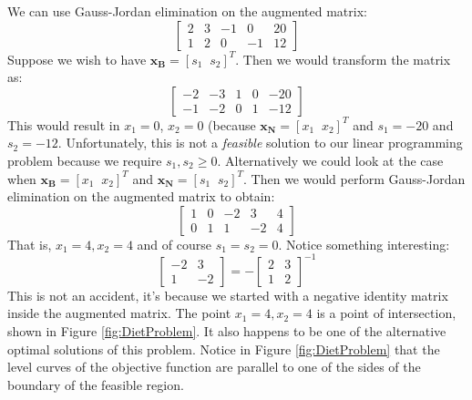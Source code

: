 \begin{example}
We can use Gauss-Jordan elimination on the augmented matrix:
\begin{displaymath}\left[
\begin{array}{cccc|c}
2 & 3 & -1 & 0 & 20\\
1 & 2 & 0 & -1 & 12
\end{array}\right]
\end{displaymath}
Suppose we wish to have $\mathbf{x}_\mathbf{B} = [s_1\;\;s_2]^T$. Then we would transform the matrix as:
\begin{displaymath}\left[
\begin{array}{cccc|c}
-2 & -3 & 1 & 0 & -20\\
-1 & -2 & 0 & 1 & -12
\end{array}\right]
\end{displaymath}
This would result in $x_1 = 0$, $x_2 = 0$ (because $\mathbf{x}_\mathbf{N} = [x_1 \;\; x_2]^T$ and $s_1 = -20$ and $s_2 = -12$. Unfortunately, this is not a \textit{feasible} solution to our linear programming problem because we require $s_1, s_2 \geq 0$. Alternatively we could look at the case when $\mathbf{x}_\mathbf{B} = [x_1\;\;x_2]^T$ and $\mathbf{x}_\mathbf{N} = [s_1 \;\; s_2]^T$. Then we would perform Gauss-Jordan elimination on the augmented matrix to obtain:\begin{displaymath}\left[
\begin{array}{cccc|c}
1 & 0 & -2 & 3 & 4\\
0 & 1 & 1 & -2 & 4
\end{array}\right]
\end{displaymath}
That is, $x_1 = 4, x_2 = 4$ and of course $s_1 = s_2 = 0$. Notice something interesting:
\begin{displaymath}
\begin{bmatrix}
-2 & 3\\
1 & -2 
\end{bmatrix} = - 
\begin{bmatrix}
2 & 3\\
1 & 2
\end{bmatrix}^{-1}
\end{displaymath}
This is not an accident, it's because we started with a negative identity matrix inside the augmented matrix. The point $x_1 = 4, x_2 = 4$ is a point of intersection, shown in Figure \ref{fig:DietProblem}. It also happens to be one of the alternative optimal solutions of this problem. Notice in Figure \ref{fig:DietProblem} that the level curves of the objective function are parallel to one of the sides of the boundary of the feasible region.

\end{example}
